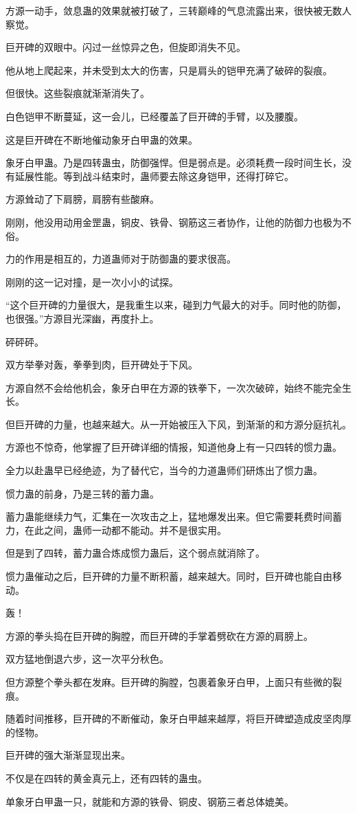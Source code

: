 \begin{this_body}
方源一动手，敛息蛊的效果就被打破了，三转巅峰的气息流露出来，很快被无数人察觉。

巨开碑的双眼中。闪过一丝惊异之色，但旋即消失不见。

他从地上爬起来，并未受到太大的伤害，只是肩头的铠甲充满了破碎的裂痕。

但很快。这些裂痕就渐渐消失了。

白色铠甲不断蔓延，这一会儿，已经覆盖了巨开碑的手臂，以及腰腹。

这是巨开碑在不断地催动象牙白甲蛊的效果。

象牙白甲蛊。乃是四转蛊虫，防御强悍。但是弱点是。必须耗费一段时间生长，没有延展性能。等到战斗结束时，蛊师要去除这身铠甲，还得打碎它。

方源耸动了下肩膀，肩膀有些酸麻。

刚刚，他没用动用金罡蛊，铜皮、铁骨、钢筋这三者协作，让他的防御力也极为不俗。

力的作用是相互的，力道蛊师对于防御蛊的要求很高。

刚刚的这一记对撞，是一次小小的试探。

“这个巨开碑的力量很大，是我重生以来，碰到力气最大的对手。同时他的防御，也很强。”方源目光深幽，再度扑上。

砰砰砰。

双方举拳对轰，拳拳到肉，巨开碑处于下风。

方源自然不会给他机会，象牙白甲在方源的铁拳下，一次次破碎，始终不能完全生长。

但巨开碑的力量，也越来越大。从一开始被压入下风，到渐渐的和方源分庭抗礼。

方源也不惊奇，他掌握了巨开碑详细的情报，知道他身上有一只四转的惯力蛊。

全力以赴蛊早已经绝迹，为了替代它，当今的力道蛊师们研炼出了惯力蛊。

惯力蛊的前身，乃是三转的蓄力蛊。

蓄力蛊能继续力气，汇集在一次攻击之上，猛地爆发出来。但它需要耗费时间蓄力，在此之间，蛊师一动都不能动。并不是很实用。

但是到了四转，蓄力蛊合炼成惯力蛊后，这个弱点就消除了。

惯力蛊催动之后，巨开碑的力量不断积蓄，越来越大。同时，巨开碑也能自由移动。

轰！

方源的拳头捣在巨开碑的胸膛，而巨开碑的手掌着劈砍在方源的肩膀上。

双方猛地倒退六步，这一次平分秋色。

但方源整个拳头都在发麻。巨开碑的胸膛，包裹着象牙白甲，上面只有些微的裂痕。

随着时间推移，巨开碑的不断催动，象牙白甲越来越厚，将巨开碑塑造成皮坚肉厚的怪物。

巨开碑的强大渐渐显现出来。

不仅是在四转的黄金真元上，还有四转的蛊虫。

单象牙白甲蛊一只，就能和方源的铁骨、铜皮、钢筋三者总体媲美。

\end{this_body}

